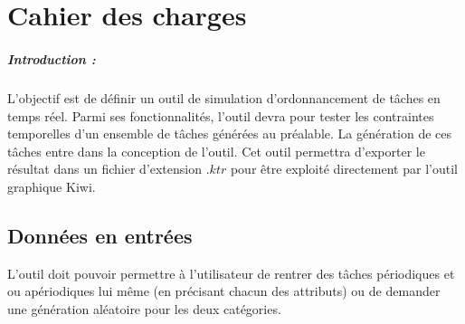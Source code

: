 \chapter{Cahier des charges}
\paragraph{Introduction :}
 L'objectif est de définir un outil de simulation  d'ordonnancement de tâches en temps réel. Parmi ses fonctionnalités, l'outil devra pour tester les contraintes temporelles d'un ensemble de tâches générées au préalable. La génération de ces tâches entre dans la conception de l'outil. Cet outil permettra d'exporter le résultat dans un fichier  d'extension $.ktr$ pour être exploité directement par l'outil graphique Kiwi.
 
\section{Données en entrées}
L'outil doit pouvoir permettre à l'utilisateur de rentrer des tâches périodiques et ou apériodiques lui même (en précisant chacun des attributs) ou de demander une génération aléatoire pour les deux catégories.
